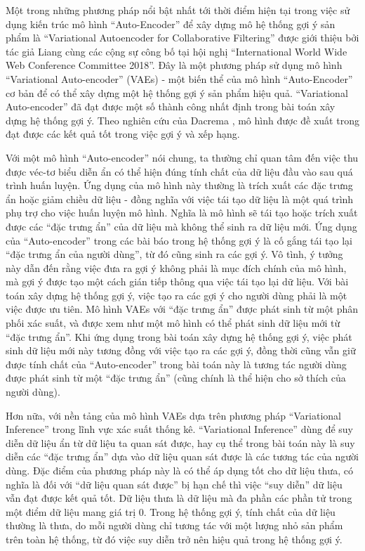 Một trong những phương pháp nổi bật nhất tới thời điểm hiện tại trong việc sử dụng kiến trúc mô hình ``Auto-Encoder'' để xây dựng mô hệ thống gợi ý sản phẩm là ``Variational Autoencoder for Collaborative Filtering''\cite{mvae} được giới thiệu bởi tác giả Liang cùng các cộng sự công bố tại hội nghị ``International World Wide Web Conference Committee 2018''. 
Đây là một phương pháp sử dụng mô hình ``Variational Auto-encoder'' (VAEs) - một biến thể của mô hình ``Auto-Encoder'' cơ bản để có thể xây dựng một hệ thống gợi ý sản phẩm hiệu quả.
``Variational Auto-encoder'' đã đạt được một số thành công nhất định trong bài toán xây dựng hệ thống gợi ý. 
Theo nghiên cứu của Dacrema \cite{dacrema2019we}, mô hình được đề xuất trong \cite{mvae} đạt được các kết quả tốt trong việc gợi ý và xếp hạng. 

Với một mô hình ``Auto-encoder'' nói chung, ta thường chỉ quan tâm đến việc thu được véc-tơ biểu diễn ẩn có thể hiện đúng tính chất của dữ liệu đầu vào sau quá trình huấn luyện. Ứng dụng của mô hình này thường là trích xuất các đặc trưng ẩn hoặc giảm chiều dữ liệu - đồng nghĩa với việc tái tạo dữ liệu là một quá trình phụ trợ cho việc huấn luyện mô hình. Nghĩa là mô hình sẽ tái tạo hoặc trích xuất được các ``đặc trưng ẩn'' của dữ liệu mà không thể sinh ra dữ liệu mới. 
Ứng dụng của ``Auto-encoder'' trong các bài báo \cite{autorec,cdae} trong hệ thống gợi ý là cố gắng tái tạo lại ``đặc trưng ẩn của người dùng'', từ đó cũng sinh ra các gợi ý.
Vô tình, ý tưởng này dẫn đến rằng việc đưa ra gợi ý không phải là mục đích chính của mô hình, mà gợi ý được tạo một cách gián tiếp thông qua việc tái tạo lại dữ liệu.
Với bài toán xây dựng hệ thống gợi ý, việc tạo ra các gợi ý cho người dùng phải là một việc được ưu tiên. 
Mô hình VAEs với ``đặc trưng ẩn'' được phát sinh từ một phân phối xác suất, và được xem như một mô hình có thể phát sinh dữ liệu mới từ ``đặc trưng ẩn''. 
Khi ứng dụng trong bài toán xây dựng hệ thống gợi ý, việc phát sinh dữ liệu mới này tương đồng với việc tạo ra các gợi ý, đồng thời cũng vẫn giữ được tính chất của ``Auto-encoder'' trong bài toán này là tương tác người dùng được phát sinh từ một ``đặc trưng ẩn'' (cũng chính là thể hiện cho sở thích của người dùng).


Hơn nữa, với nền tảng của mô hình VAEs dựa trên phương pháp ``Variational Inference'' trong lĩnh vực xác suất thống kê. 
``Variational Inference'' dùng để suy diễn dữ liệu ẩn từ dữ liệu ta quan sát được, hay cụ thể trong bài toán này là suy diễn các ``đặc trưng ẩn'' dựa vào dữ liệu quan sát được là các tương tác của người dùng. 
Đặc điểm của phương pháp này là có thể áp dụng tốt cho dữ liệu thưa, có nghĩa là đối với ``dữ liệu quan sát được'' bị hạn chế thì việc ``suy diễn'' dữ liệu vẫn đạt được kết quả tốt. 
Dữ liệu thưa là dữ liệu mà đa phần các phần tử trong một điểm dữ liệu mang giá trị 0.
Trong hệ thống gợi ý, tính chất của dữ liệu thường là thưa, do mỗi người dùng chỉ tương tác với một lượng nhỏ sản phẩm trên toàn hệ thống, từ đó việc suy diễn trở nên hiệu quả trong hệ thống gợi ý.

